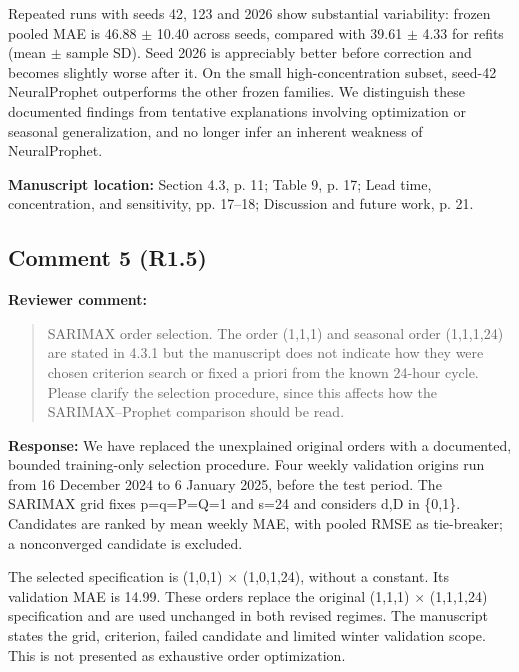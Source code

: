 \documentclass[11pt,a4paper]{article}
\begin{document}
Repeated runs with seeds 42, 123 and 2026 show substantial variability: frozen pooled MAE is 46.88 $\pm$ 10.40 across seeds, compared with 39.61 $\pm$ 4.33 for refits (mean $\pm$ sample SD). Seed 2026 is appreciably better before correction and becomes slightly worse after it. On the small high-concentration subset, seed-42 NeuralProphet outperforms the other frozen families. We distinguish these documented findings from tentative explanations involving optimization or seasonal generalization, and no longer infer an inherent weakness of NeuralProphet.

\textbf{Manuscript location:} Section 4.3, p. 11; Table 9, p. 17; Lead time, concentration, and sensitivity, pp. 17--18; Discussion and future work, p. 21.
\begin{samepage}
\subsection*{Comment 5 (R1.5)}
\textbf{Reviewer comment:}
\begin{quote}\small SARIMAX order selection. The order (1,1,1) and seasonal order (1,1,1,24) are stated in 4.3.1 but the manuscript does not indicate how they were chosen criterion search or fixed a priori from the known 24-hour cycle. Please clarify the selection procedure, since this affects how the SARIMAX--Prophet comparison should be read.\end{quote}
\end{samepage}
\textbf{Response:}
We have replaced the unexplained original orders with a documented, bounded training-only selection procedure. Four weekly validation origins run from 16 December 2024 to 6 January 2025, before the test period. The SARIMAX grid fixes p=q=P=Q=1 and s=24 and considers d,D in \{0,1\}. Candidates are ranked by mean weekly MAE, with pooled RMSE as tie-breaker; a nonconverged candidate is excluded.

The selected specification is (1,0,1) $\times$ (1,0,1,24), without a constant. Its validation MAE is 14.99. These orders replace the original (1,1,1) $\times$ (1,1,1,24) specification and are used unchanged in both revised regimes. The manuscript states the grid, criterion, failed candidate and limited winter validation scope. This is not presented as exhaustive order optimization.
\end{document}
